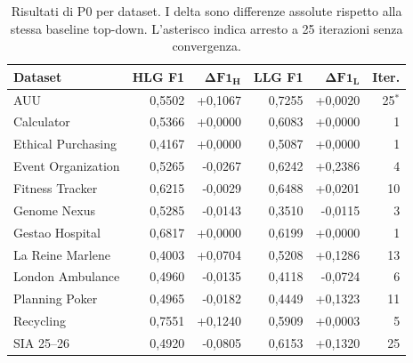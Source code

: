 \begin{table}[htbp]
\centering
\small
\caption{Risultati di P0 per dataset. I delta sono differenze assolute rispetto alla stessa baseline top-down. L'asterisco indica arresto a 25 iterazioni senza convergenza.}
\label{tab:results-P0-datasets}
\begin{tabular}{lrrrrr}
\toprule
\textbf{Dataset} & \textbf{HLG F1} & $\boldsymbol{\Delta F1_H}$ & \textbf{LLG F1} & $\boldsymbol{\Delta F1_L}$ & \textbf{Iter.} \\
\midrule
AUU & 0,5502 & +0,1067 & 0,7255 & +0,0020 & 25$^{*}$ \\
Calculator & 0,5366 & +0,0000 & 0,6083 & +0,0000 & 1 \\
Ethical Purchasing & 0,4167 & +0,0000 & 0,5087 & +0,0000 & 1 \\
Event Organization & 0,5265 & -0,0267 & 0,6242 & +0,2386 & 4 \\
Fitness Tracker & 0,6215 & -0,0029 & 0,6488 & +0,0201 & 10 \\
Genome Nexus & 0,5285 & -0,0143 & 0,3510 & -0,0115 & 3 \\
Gestao Hospital & 0,6817 & +0,0000 & 0,6199 & +0,0000 & 1 \\
La Reine Marlene & 0,4003 & +0,0704 & 0,5208 & +0,1286 & 13 \\
London Ambulance & 0,4960 & -0,0135 & 0,4118 & -0,0724 & 6 \\
Planning Poker & 0,4965 & -0,0182 & 0,4449 & +0,1323 & 11 \\
Recycling & 0,7551 & +0,1240 & 0,5909 & +0,0003 & 5 \\
SIA 25--26 & 0,4920 & -0,0805 & 0,6153 & +0,1320 & 25 \\
\bottomrule
\end{tabular}
\end{table}

